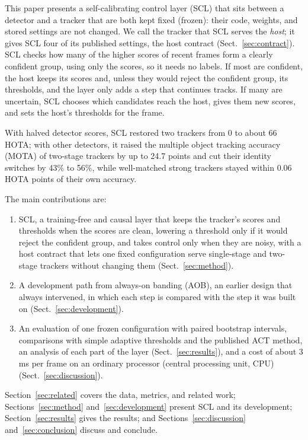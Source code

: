 \documentclass[pdflatex,sn-mathphys-num,iicol]{sn-jnl}
\newcommand{\scl}{SCL}
\newcommand{\aob}{AOB}
\begin{document}
This paper presents a self-calibrating control layer (\scl{}) that sits between a detector and a
tracker that are both kept fixed (frozen): their code, weights, and stored settings are not
changed. We call the tracker that \scl{} serves the \emph{host}; it gives \scl{} four of its
published settings, the host contract (Sect.~\ref{sec:contract}). \scl{} checks how many of the
higher scores of recent frames form a clearly confident group, using only the scores, so it needs
no labels. If most are confident, the host keeps its scores and, unless they would reject the
confident group, its thresholds, and the layer only adds a step that continues tracks. If many are uncertain, \scl{} chooses which candidates reach the host, gives
them new scores, and sets the host's thresholds for the frame.

With halved detector scores, \scl{} restored two trackers from 0 to about 66 HOTA; with other
detectors, it raised the multiple object tracking accuracy (MOTA) of two-stage trackers by up to
24.7 points and cut their identity switches by 43\% to 56\%, while well-matched strong trackers
stayed within 0.06 HOTA points of their own accuracy.

The main contributions are:
\begin{enumerate}
\item \scl{}, a training-free and causal layer that keeps the tracker's scores and thresholds when
      the scores are clean, lowering a threshold only if it would reject the confident group, and
      takes control only when they are noisy, with a host contract that lets one fixed
      configuration serve single-stage and two-stage trackers without changing them
      (Sect.~\ref{sec:method}).
\item A development path from always-on banding (\aob{}), an earlier design that always
      intervened, in which each step is compared with the step it was built on
      (Sect.~\ref{sec:development}).
\item An evaluation of one frozen configuration with paired bootstrap intervals, comparisons with
      simple adaptive thresholds and the published ACT method, an analysis of each part of the
      layer (Sect.~\ref{sec:results}), and a cost of about 3 ms per frame on an ordinary processor
      (central processing unit, CPU) (Sect.~\ref{sec:discussion}).
\end{enumerate}

Section~\ref{sec:related} covers the data, metrics, and related work;
Sections~\ref{sec:method} and~\ref{sec:development} present \scl{} and its development;
Section~\ref{sec:results} gives the results; and Sections~\ref{sec:discussion}
and~\ref{sec:conclusion} discuss and conclude.
\end{document}
